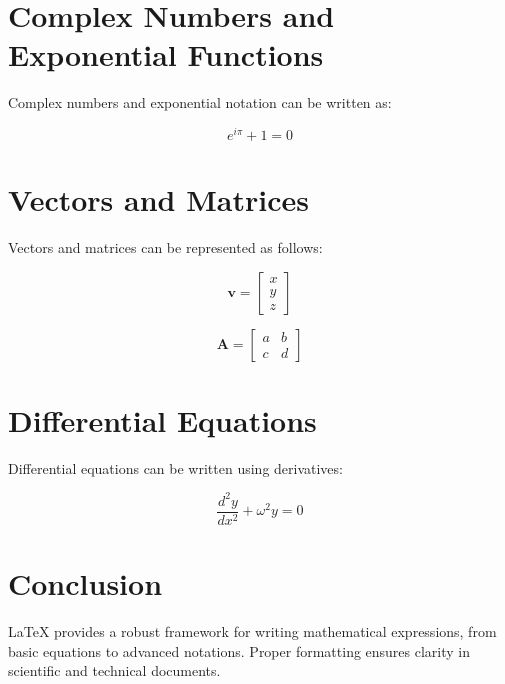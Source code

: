 \documentclass{article}
\begin{document}
\section{Complex Numbers and Exponential Functions}
Complex numbers and exponential notation can be written as:

\[ e^{i\pi} + 1 = 0 \]

\section{Vectors and Matrices}
Vectors and matrices can be represented as follows:

\[ \mathbf{v} = \begin{bmatrix} x \\ y \\ z \end{bmatrix} \]

\[ \mathbf{A} = \begin{bmatrix} a & b \\ c & d \end{bmatrix} \]

\section{Differential Equations}
Differential equations can be written using derivatives:

\[ \frac{d^2y}{dx^2} + \omega^2 y = 0 \]

\section{Conclusion}
LaTeX provides a robust framework for writing mathematical expressions, from basic equations to advanced notations. Proper formatting ensures clarity in scientific and technical documents.
\end{document}
